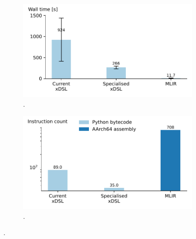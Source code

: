 
\begin{figure}[H]
    \centering
    \begin{subfigure}[b]{0.45\textwidth}
        \includegraphics[width=\textwidth]{images/specialising_optimising_xdsl_rewriting/trait_performance.pdf}
        \caption{.}
        \label{fig:ubenchmark-original-trait-performance}
    \end{subfigure}
    \hfill
    \begin{subfigure}[b]{0.45\textwidth}
        \includegraphics[width=\textwidth]{images/specialising_optimising_xdsl_rewriting/trait_instructions.pdf}
        \caption{.}
        \label{ubenchmark-original-trait-instructions}
    \end{subfigure}
    \caption{.}
    \label{ubenchmark-original-trait-summary}
\end{figure}







